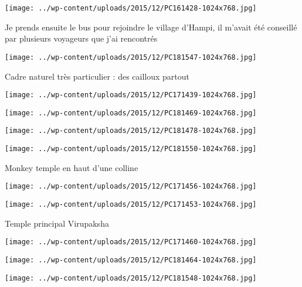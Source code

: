 \centerline{\texttt{[image: ../wp-content/uploads/2015/12/PC161428-1024x768.jpg]} } 
 \newline
 Je prends ensuite le bus pour rejoindre le village d'Hampi, il m'avait été conseillé par plusieurs voyageurs que j'ai rencontrés \newline
 \newline
\centerline{\texttt{[image: ../wp-content/uploads/2015/12/PC181547-1024x768.jpg]} } 
 \newline
 Cadre naturel très particulier : des cailloux partout \newline
 \newline
\centerline{\texttt{[image: ../wp-content/uploads/2015/12/PC171439-1024x768.jpg]} } 
 \newline
 \newline
\centerline{\texttt{[image: ../wp-content/uploads/2015/12/PC181469-1024x768.jpg]} } 
 \newline
 \newline
\centerline{\texttt{[image: ../wp-content/uploads/2015/12/PC181478-1024x768.jpg]} } 
 \newline
 \newline
\centerline{\texttt{[image: ../wp-content/uploads/2015/12/PC181550-1024x768.jpg]} } 
 \newline
 Monkey temple en haut d'une colline \newline
 \newline
\centerline{\texttt{[image: ../wp-content/uploads/2015/12/PC171456-1024x768.jpg]} } 
 \newline
 \newline
\centerline{\texttt{[image: ../wp-content/uploads/2015/12/PC171453-1024x768.jpg]} } 
 \newline
 Temple principal Virupaksha \newline
 \newline
\centerline{\texttt{[image: ../wp-content/uploads/2015/12/PC171460-1024x768.jpg]} } 
 \newline
 \newline
\centerline{\texttt{[image: ../wp-content/uploads/2015/12/PC181464-1024x768.jpg]} } 
 \newline
 \newline
\centerline{\texttt{[image: ../wp-content/uploads/2015/12/PC181548-1024x768.jpg]} } 
 \newline
